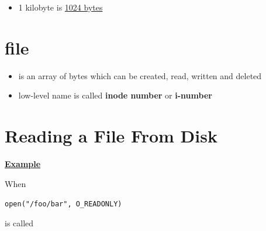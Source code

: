 \documentclass[12pt]{article}
\begin{document}
\begin{itemize}
    \item 1 kilobyte is \underline{1024 bytes}
\end{itemize}

\section{file}
\begin{itemize}
    \item is an array of bytes which can be created, read, written and deleted
    \item low-level name is called \textbf{inode number} or \textbf{i-number}
\end{itemize}
\section{Reading a File From Disk}

\bigskip

\underline{\textbf{Example}}

\bigskip

When

\bigskip

\texttt{open("/foo/bar", O\_READONLY)}

\bigskip

is called

\bigskip
\end{document}
